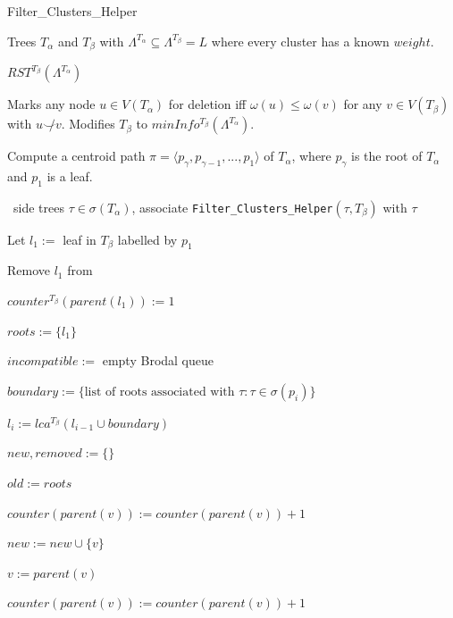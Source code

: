 \documentclass{article}
\newcommand{\compatible}{\smile}
\newcommand{\leafset}{\Lambda}
\newcommand{\weight}{\omega}
\newcommand{\TA}{T_\alpha}
\newcommand{\TB}{T_\beta}
\begin{document}
    \begin{algorithm}[H]
        \caption{Filter\_Clusters\_Helper}
        \label{alg:filterclustershelper}

        \begin{algorithmic}[1]
            \Input Trees $\TA$ and $\TB$ with $\leafset^{\TA} \subseteq \leafset^{\TB} = L$ where every cluster has a known $weight$.

            \Output $RST^{\TB}(\leafset^{\TA})$

            \SideEffect Marks any node $u \in V(\TA)$ for deletion iff $\weight(u) \leq \weight(v)$ for any $v \in V(\TB)$ with $u \not\compatible v$. Modifies $\TB$ to $minInfo^{\TB}(\leafset^{\TA})$.

            \State Compute a centroid path $\pi = \langle p_{\gamma}, p_{\gamma - 1}, ..., p_1 \rangle$ of $\TA$, where $p_{\gamma}$ is the root of $\TA$ and $p_1$ is a leaf.

            \State \algorithmicforall\ side trees $\tau \in \sigma(\TA)$,
                associate \texttt{Filter\_Clusters\_Helper}$(\tau, \TB)$ with $\tau$

            \State Let $l_1 :=$ leaf in $\TB$ labelled by $p_1$

            \State Remove $l_1$ from $ $

            \State $counter^{\TB}(parent(l_1)) := 1$

            \State $roots := \{l_1\}$

            \State $incompatible :=$ empty Brodal queue

                \State $boundary := \{\text{list of roots associated with } \tau : \tau \in \sigma(p_i)\}$

                \State $l_i := lca^{\TB}(l_{i-1} \cup boundary)$

                \State $new, removed := \{\}$

                \State $old := roots$

                    \State $counter(parent(v)) := counter(parent(v)) + 1$

                    \State $new := new \cup \{v\}$

                    \State $v := parent(v)$

                        \State $counter(parent(v)) := counter(parent(v)) + 1$


\end{algorithmic}
\end{algorithm}
\end{document}
